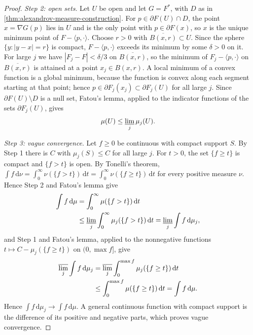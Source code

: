 \begin{proof}
\emph{Step 2: open sets.} Let $U$ be open and let $G=F^*$, with $D$ as in \cref{thm:alexandrov-measure-construction}. For $p\in\partial F(U)\cap D$, the point $x=\nabla G(p)$ lies in $U$ and is the only point with $p\in\partial F(x)$, so $x$ is the unique minimum point of $F-\langle p,\cdot\rangle$. Choose $r>0$ with $\overline{B(x,r)}\subset U$. Since the sphere $\{y:|y-x|=r\}$ is compact, $F-\langle p,\cdot\rangle$ exceeds its minimum by some $\delta>0$ on it. For large $j$ we have $|F_j-F|<\delta/3$ on $\overline{B(x,r)}$, so the minimum of $F_j-\langle p,\cdot\rangle$ on $\overline{B(x,r)}$ is attained at a point $x_j\in B(x,r)$. A local minimum of a convex function is a global minimum, because the function is convex along each segment starting at that point; hence $p\in\partial F_j(x_j)\subset\partial F_j(U)$ for all large $j$. Since $\partial F(U)\setminus D$ is a null set, Fatou's lemma, applied to the indicator functions of the sets $\partial F_j(U)$, gives
\[
 \mu(U)\leq\varliminf_j\mu_j(U).
\]

\emph{Step 3: vague convergence.} Let $f\geq0$ be continuous with compact support $S$. By Step 1 there is $C$ with $\mu_j(S)\leq C$ for all large $j$. For $t>0$, the set $\{f\geq t\}$ is compact and $\{f>t\}$ is open. By Tonelli's theorem, $\int f\,\mathrm d\nu=\int_0^\infty\nu(\{f>t\})\,\mathrm dt=\int_0^\infty\nu(\{f\geq t\})\,\mathrm dt$ for every positive measure $\nu$. Hence Step 2 and Fatou's lemma give
\[
\begin{split}
 \int f\,\mathrm d\mu&=\int_0^\infty\mu(\{f>t\})\,\mathrm dt\\
 &\leq\varliminf_j\int_0^\infty\mu_j(\{f>t\})\,\mathrm dt=\varliminf_j\int f\,\mathrm d\mu_j,
\end{split}
\]
and Step 1 and Fatou's lemma, applied to the nonnegative functions $t\mapsto C-\mu_j(\{f\geq t\})$ on $(0,\max f]$, give
\[
\begin{split}
 \varlimsup_j\int f\,\mathrm d\mu_j&=\varlimsup_j\int_0^{\max f}\mu_j(\{f\geq t\})\,\mathrm dt\\
 &\leq\int_0^{\max f}\mu(\{f\geq t\})\,\mathrm dt=\int f\,\mathrm d\mu.
\end{split}
\]
Hence $\int f\,\mathrm d\mu_j\to\int f\,\mathrm d\mu$. A general continuous function with compact support is the difference of its positive and negative parts, which proves vague convergence.


\end{proof}
